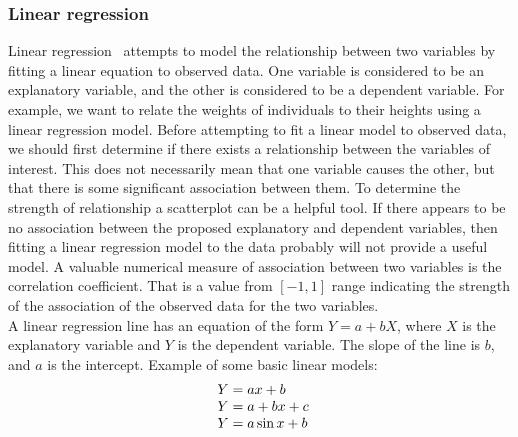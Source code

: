 \subsubsection{Linear regression} \label{sec:linear}
Linear regression~\cite{linear} attempts to model the relationship between two variables by fitting a linear equation to observed data.
One variable is considered to be an explanatory variable, and the other is considered to be a dependent variable.
For example, we want to relate the weights of individuals to their heights using a linear regression model.
Before attempting to fit a linear model to observed data, we should first determine if there exists a relationship between the variables of interest.
This does not necessarily mean that one variable causes the other, but that there is some significant association between them.
To determine the strength of relationship a scatterplot can be a helpful tool.
If there appears to be no association between the proposed explanatory and dependent variables, then fitting a linear regression
model to the data probably will not provide a useful model.
A valuable numerical measure of association between two variables is the correlation coefficient.
That is a value from $[-1, 1]$ range indicating the strength of the association of the observed data for the two variables.\\
A linear regression line has an equation of the form $Y = a + bX$, where $X$ is the explanatory variable and $Y$ is the dependent variable.
The slope of the line is $b$, and $a$ is the intercept.
Example of some basic linear models:\\
\begin{equation} \label{eq:4}
\begin{array}{l@{}l}
	Y = ax + b\\
	Y = a + bx + c\\
	Y = a\sin x + b\\
\end{array}
\end{equation}

